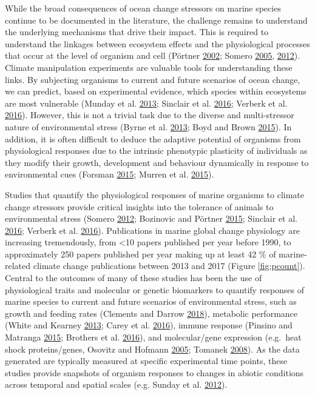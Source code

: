 \documentclass[a4paper,10pt, oneside]{memoir}
\begin{document}
While the broad consequences of ocean change stressors on marine species continue to be documented in the literature, the challenge remains to understand the underlying mechanisms that drive their impact.
This is required to understand the linkages between ecosystem effects and the physiological processes that occur at the level of organism and cell (Pörtner \protect\hyperlink{ref-Portner2002}{2002}; Somero \protect\hyperlink{ref-Somero2005}{2005}, \protect\hyperlink{ref-Somero2012}{2012}).
Climate manipulation experiments are valuable tools for understanding these links.
By subjecting organisms to current and future scenarios of ocean change, we can predict, based on experimental evidence, which species within ecosystems are most vulnerable (Munday et al. \protect\hyperlink{ref-Munday2013}{2013}; Sinclair et al. \protect\hyperlink{ref-Sinclair2016}{2016}; Verberk et al. \protect\hyperlink{ref-Verberk2016}{2016}).
However, this is not a trivial task due to the diverse and multi-stressor nature of environmental stress (Byrne et al. \protect\hyperlink{ref-Byrne2013}{2013}; Boyd and Brown \protect\hyperlink{ref-Boyd2015}{2015}).
In addition, it is often difficult to deduce the adaptive potential of organisms from physiological responses due to the intrinsic phenotypic plasticity of individuals as they modify their growth, development and behaviour dynamically in response to environmental cues (Forsman \protect\hyperlink{ref-Forsman2015}{2015}; Murren et al. \protect\hyperlink{ref-Murren2015}{2015}).

Studies that quantify the physiological responses of marine organisms to climate change stressors provide critical insights into the tolerance of animals to environmental stress (Somero \protect\hyperlink{ref-Somero2012}{2012}; Bozinovic and Pörtner \protect\hyperlink{ref-Bozinovic2015}{2015}; Sinclair et al. \protect\hyperlink{ref-Sinclair2016}{2016}; Verberk et al. \protect\hyperlink{ref-Verberk2016}{2016}).
Publications in marine global change physiology are increasing tremendously, from \textless{}10 papers published per year before 1990, to approximately 250 papers published per year making up at least 42 \% of marine-related climate change publications between 2013 and 2017 (Figure \ref{fig:pcount}).
Central to the outcomes of many of these studies has been the use of physiological traits and molecular or genetic biomarkers to quantify responses of marine species to current and future scenarios of environmental stress, such as growth and feeding rates (Clements and Darrow \protect\hyperlink{ref-Clements2018}{2018}), metabolic performance (White and Kearney \protect\hyperlink{ref-White2013}{2013}; Carey et al. \protect\hyperlink{ref-Carey2016}{2016}), immune response (Pinsino and Matranga \protect\hyperlink{ref-Pinsino2015}{2015}; Brothers et al. \protect\hyperlink{ref-Brothers2016}{2016}), and molecular/gene expression (e.g.~heat shock proteins/genes, Osovitz and Hofmann \protect\hyperlink{ref-Osovitz2005}{2005}; Tomanek \protect\hyperlink{ref-Tomanek2008}{2008}).
As the data generated are typically measured at specific experimental time points, these studies provide snapshots of organism responses to changes in abiotic conditions across temporal and spatial scales (e.g. Sunday et al. \protect\hyperlink{ref-Sunday2012}{2012}).
\end{document}
